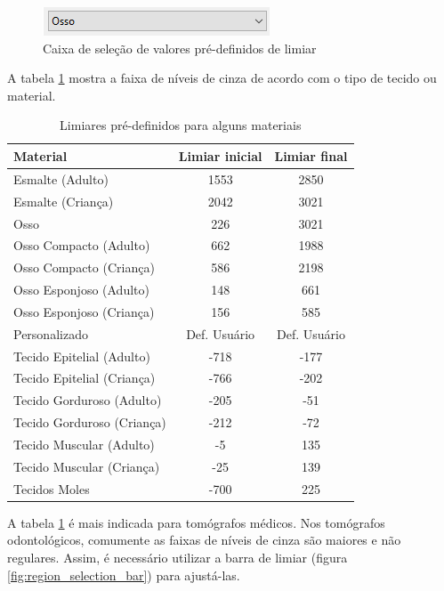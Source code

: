 \begin{figure}[!htb]
\centering
\includegraphics[scale=0.65]{../user_guide_figures/invesalius_screen/segmentation_threshold_presets_pt.png}
\caption{Caixa de seleção de valores pré-definidos de limiar}
\label{fig:limiar_presets}
\end{figure}

A tabela \ref{tab:limiar} mostra a faixa de níveis de cinza de acordo com o tipo de tecido ou material.

\begin{table}[h]
\centering
\caption{Limiares pré-definidos para alguns materiais}
\begin{tabular}{lcc}\\
\hline %
Material & Limiar inicial & Limiar final\\
\hline
\hline
Esmalte (Adulto) & 1553 & 2850\\
Esmalte (Criança) & 2042 & 3021\\
Osso & 226 & 3021\\
Osso Compacto (Adulto) & 662 & 1988\\
Osso Compacto (Criança) & 586 & 2198\\
Osso Esponjoso (Adulto) & 148 & 661\\
Osso Esponjoso (Criança) & 156 & 585\\
Personalizado & Def. Usuário & Def. Usuário\\
Tecido Epitelial (Adulto) & -718 & -177\\
Tecido Epitelial (Criança) & -766 & -202\\
Tecido Gorduroso (Adulto) & -205 & -51\\
Tecido Gorduroso (Criança) & -212 & -72\\
Tecido Muscular (Adulto) & -5 & 135\\
Tecido Muscular (Criança) & -25 & 139\\
Tecidos Moles & -700 & 225\\
\hline
\end{tabular}
\label{tab:limiar}
\end{table} 
\newpage

A tabela \ref{tab:limiar} é mais indicada para tomógrafos médicos. Nos tomógrafos odontológicos,
comumente as faixas de níveis de cinza são maiores e não regulares. Assim, é necessário utilizar
a barra de limiar (figura \ref{fig:region_selection_bar}) para ajustá-las.


